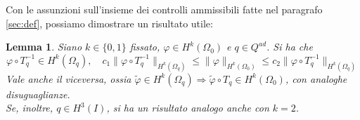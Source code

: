 \documentclass[a4paper,11pt,twoside]{article}
\newcommand{\Q}{Q^{ad}}
\renewcommand{\O}{{\Omega_0}}
\newcommand{\Oq}{{\Omega_q}}
\theoremstyle{plain}
\newtheorem{lemma}[teor]{Lemma}
\theoremstyle{definition}
\theoremstyle{remark}
\begin{document}
Con le assunzioni sull'insieme dei controlli ammissibili fatte nel paragrafo \ref{sec:def}, possiamo dimostrare un risultato utile:
\begin{lemma}
	Siano $k\in\{0,1\}$ fissato, $\varphi\in H^{k}(\O)$ e $q\in\Q$. Si ha che
	$$\varphi\circ T_q^{-1}\in H^k(\Oq),\quad c_1\|\varphi\circ T_q^{-1}\|_{H^k(\Oq)}\leq\|\varphi\|_{H^k(\O)}\leq c_2\|\varphi\circ T_q^{-1}\|_{H^k(\Oq)}$$
	Vale anche il viceversa, ossia $\widetilde{\varphi}\in H^k(\Oq)\Rightarrow\widetilde{\varphi}\circ T_q\in H^k(\O)$, con analoghe disuguaglianze.\\
	Se, inoltre, $q\in H^3(I)$, si ha un risultato analogo anche con $k=2$.
\label{th:HkTq}
\end{lemma}





%
\clearpage
\newpage
%


\end{document}
